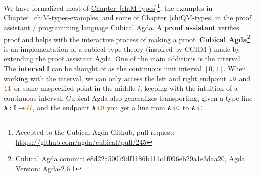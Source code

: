 \documentclass[twoside,11pt,openright]{report}
\theoremstyle{plain} %
\theoremstyle{definition}
\theoremstyle{remark}
\newcommand*{\chapterref}[1]{\hyperref[ch:#1]{Chapter~\ref*{ch:#1}}}
\newcommand*{\universe}[1]{\textcolor{orange!80!black}{#1}}
\newcommand*{\constant}[1]{\textcolor{orange!60!black}{\ensuremath{\mathtt{#1}}}}
\newcommand*{\typeformer}[1]{\ensuremath{\mathtt{#1}}}
\begin{document}
\\ \\
We have formalized most of \chapterref{M-types}\footnote{Accepted to the Cubical Agda Github, pull request: \url{https://github.com/agda/cubical/pull/245}}, the examples in \chapterref{M-types-examples} and some of \chapterref{QM-types} in the proof assistant / programming language Cubical Agda. A \textbf{proof assistant} verifies proof and helps with the interactive process of making a proof. \textbf{Cubical Agda}\footnote{Cubical Agda commit: e8d22a50079df1186b111c1f096eb29a1e3daa20, Agda Version: Agda-2.6.1} \cite{cubicalagda} is an implementation of a cubical type theory (inspired by CCHM \cite{DBLP:CCHM}) made by extending the proof assistant Agda. One of the main additions is the interval. The \textbf{interval} \(\mathbb{I}\) can be thought of as the continuous unit interval \([0,1]\). When working with the interval, we can only access the left and right endpoint \(\constant{i0}\) and \(\constant{i1}\) or some unspecified point in the middle \(i\), keeping with the intuition of a continuous interval. Cubical Agda also generalizes transporting, given a type line \(\typeformer{A} : \mathbb{I} \rightarrow \universe{\mathcal{U}}\), and the endpoint \(\typeformer{A}\,\constant{i0}\) you get a line from \(\typeformer{A}\,\constant{i0}\) to \(\typeformer{A}\,\constant{i1}\).
\end{document}
